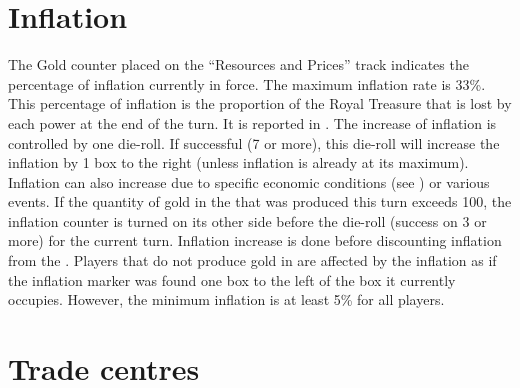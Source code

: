 \section{Inflation}\label{chInter:Inflation}

\aparag The Gold counter placed on the ``Resources and Prices'' track
indicates the percentage of inflation currently in force. The maximum
inflation rate is 33\%.
\bparag This percentage of inflation is the proportion of the Royal Treasure
that is lost by each power at the end of the turn. It is reported in
.
 The increase of inflation is controlled by one
die-roll. If successful (7 or more), this die-roll will increase the inflation
by 1 box to the right (unless inflation is already at its maximum).
\bparag Inflation can also increase due to specific economic conditions (see
) or various events.
\bparag \label{chInter:Inflation Gold ROTW} If the quantity of gold in the
\ROTW that was produced this turn exceeds 100\ducats, the inflation counter is
turned on its other side before the die-roll (success on 3 or more) for the
current turn.
\bparag Inflation increase is done before discounting inflation from the \RT.
 \label{chInter:InflationGold} Players that do not
produce gold in  are affected by the inflation as if the
inflation marker was found one box to the left of the box it currently
occupies.
\bparag However, the minimum inflation is at least 5\% for all players.



\section{Trade centres}\label{chInter:Trade Centres}


